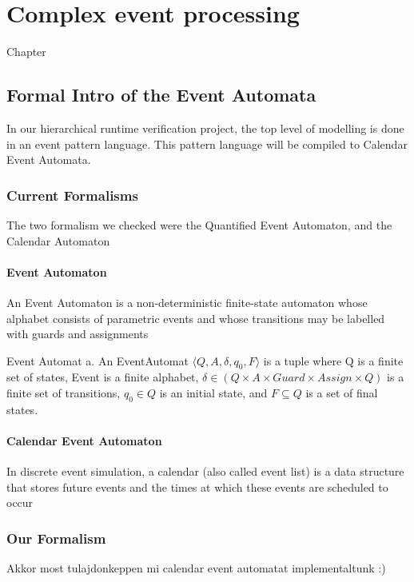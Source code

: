 \chapter{Complex event processing}
\label{chap:cep}

Chapter
\section{Formal Intro of the Event Automata}
	In our hierarchical runtime verification project, the top level of modelling is done in an event pattern language.
	This pattern language will be compiled to Calendar Event Automata.
	\subsection{Current Formalisms}
		The two formalism we checked were the Quantified Event Automaton, and the Calendar Automaton
		\subsubsection{Event Automaton}
			An Event Automaton is a non-deterministic finite-state automaton whose alphabet consists
			of parametric events and whose transitions may be labelled with guards and assignments
			
			\begin{dfn}
			Event Automat a. An EventAutomat $\langle Q,A,\delta, q_0, F \rangle$
			is a tuple where Q is a finite set of states,  \subseteq
			Event is a finite alphabet, $\delta \in (Q \times A \times Guard \times Assign \times Q)$
			is a finite set of transitions, $q_0 \in Q$ is an initial state, and $F \subseteq Q$ is a set of final states.
			\end{dfn}
			
		\subsubsection{Calendar Event Automaton}
			In discrete event simulation, a calendar (also called event list) is a data structure that
			stores future events and the times at which these events are scheduled to occur
			
	\subsection{Our Formalism}
		Akkor most tulajdonkeppen mi calendar event automatat implementaltunk :) 
